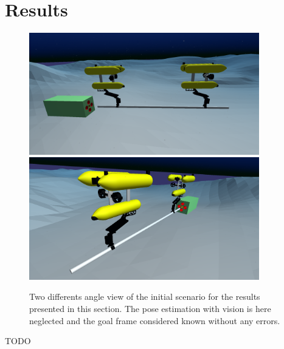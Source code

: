\section{Results}
\begin{figure}[H]
	\centering
	\includegraphics[width=10cm]{scenario_onlyTwin.png}
	\includegraphics[width=10cm]{scenario_onlyTwin2.png}
	
	\caption[Scenario for test without the vision part]{Two differents angle view of the initial scenario for the results presented in this section. The pose estimation with vision is here neglected and the goal frame considered known without any errors.}
	\label{fig:onlyTwin_uwsim}
\end{figure}

{\LARGE TODO}